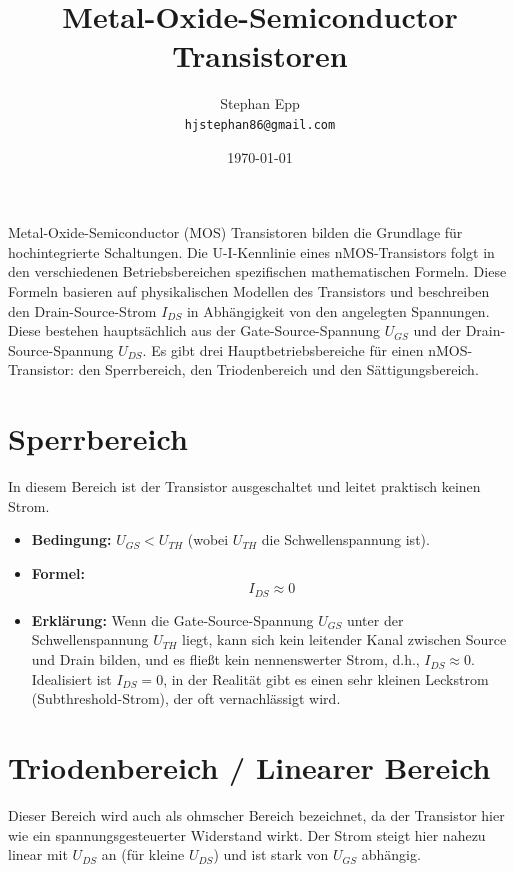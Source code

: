 \documentclass{scrarticle}
\title{Metal-Oxide-Semiconductor Transistoren}
\author{Stephan Epp\\\texttt{hjstephan86@gmail.com}}
\date{\today}
\numberwithin{equation}{section}
\begin{document}
\maketitle
Metal-Oxide-Semiconductor (MOS) Transistoren bilden die Grundlage für hochintegrierte Schaltungen. Die U-I-Kennlinie eines nMOS-Transistors folgt in den verschiedenen Betriebsbereichen spezifischen mathematischen Formeln. Diese Formeln basieren auf physikalischen Modellen des Transistors und beschreiben den Drain-Source-Strom $I_{DS}$ in Abhängigkeit von den angelegten Spannungen. Diese bestehen hauptsächlich aus der Gate-Source-Spannung $U_{GS}$ und der Drain-Source-Spannung $U_{DS}$. Es gibt drei Hauptbetriebsbereiche für einen nMOS-Transistor: den Sperrbereich, den Triodenbereich und den Sättigungsbereich.

\section{Sperrbereich}
In diesem Bereich ist der Transistor ausgeschaltet und leitet praktisch keinen Strom.

\begin{itemize}
	\item \textbf{Bedingung:} $U_{GS} < U_{TH}$ (wobei $U_{TH}$ die Schwellenspannung ist).
	\item \textbf{Formel:}
	\begin{equation*}
		I_{DS} \approx 0
	\end{equation*}
	\item \textbf{Erklärung:} Wenn die Gate-Source-Spannung $U_{GS}$ unter der Schwellenspannung $U_{TH}$ liegt, kann sich kein leitender Kanal zwischen Source und Drain bilden, und es fließt kein nennenswerter Strom, d.h., $I_{DS} \approx 0$. Idealisiert ist $I_{DS} = 0$, in der Realität gibt es einen sehr kleinen Leckstrom (Subthreshold-Strom), der oft vernachlässigt wird.
\end{itemize}

\section{Triodenbereich / Linearer Bereich}
Dieser Bereich wird auch als ohmscher Bereich bezeichnet, da der Transistor hier wie ein spannungsgesteuerter Widerstand wirkt. Der Strom steigt hier nahezu linear mit $U_{DS}$ an (für kleine $U_{DS}$) und ist stark von $U_{GS}$ abhängig.
\end{document}
